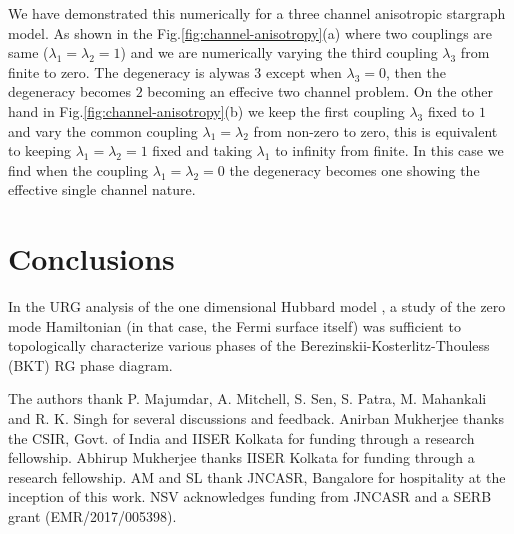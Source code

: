 \documentclass[reprint,prb,superscriptaddress]{revtex4-2}
\begin{document}
We have demonstrated this numerically for a three channel anisotropic stargraph model. As shown in the Fig.\ref{fig:channel-anisotropy}(a) where two couplings are same ($\lambda_1=\lambda_2=1$) and we are numerically varying the third coupling $\lambda_3$ from finite to zero. The degeneracy is alywas $3$ except when $\lambda_3=0$, then the degeneracy becomes $2$ becoming an effecive two channel problem. On the other hand in Fig.\ref{fig:channel-anisotropy}(b) we keep the first coupling $\lambda_3$ fixed to $1$ and vary the common coupling $\lambda_1=\lambda_2$ from non-zero to zero, this is equivalent to keeping $\lambda_1=\lambda_2=1$ fixed and taking $\lambda_1$ to infinity from finite. In this case we find when the coupling $\lambda_1=\lambda_2=0$ the degeneracy becomes one showing the effective single channel nature.


\section{Conclusions}
\lipsum[1-5]

In the URG analysis of the one dimensional Hubbard model \cite{1dhubjhep}, a study of the zero mode Hamiltonian (in that case, the Fermi surface itself) was sufficient to topologically characterize various phases of the Berezinskii-Kosterlitz-Thouless (BKT) RG phase diagram. 


\acknowledgments
The authors thank P. Majumdar, A. Mitchell, S. Sen, S. Patra, M. Mahankali and R. K. Singh for several discussions and feedback. Anirban Mukherjee thanks the CSIR, Govt. of India and IISER Kolkata for funding through a research fellowship. Abhirup Mukherjee thanks IISER Kolkata for funding through a research fellowship. AM and SL thank JNCASR, Bangalore for hospitality at the inception of this work. NSV acknowledges funding from JNCASR and a SERB grant (EMR/2017/005398).


\end{document}
